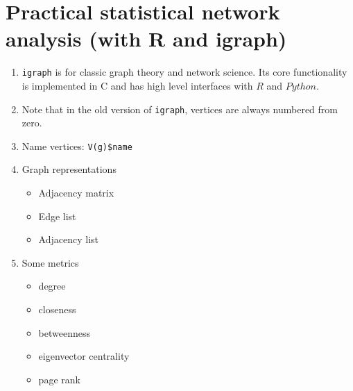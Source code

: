 \documentclass[14pt]{article}
\begin{document}
\section{Practical statistical network analysis (with R and igraph)}
\begin{enumerate}
 \item \texttt{igraph} is for classic graph theory and network science. Its core functionality is implemented in C and has high level interfaces with $R$ and $Python$.
 \item Note that in the old version of \texttt{igraph}, vertices are always numbered from zero.
 \item Name vertices: \texttt{V(g)\$name}
 \item Graph representations
  \begin{itemize}
   \item Adjacency matrix
   \item Edge list
   \item Adjacency list
  \end{itemize}
 \item Some metrics
  \begin{itemize}
   \item degree
   \item closeness
   \item betweenness
   \item eigenvector centrality
   \item page rank
  \end{itemize}
\end{enumerate}
\end{document}
